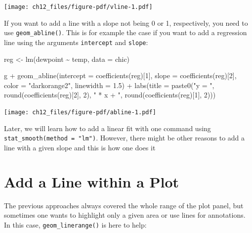 \documentclass[
  letterpaper,
]{scrbook}
\newenvironment{Shaded}{\begin{snugshade}}{\end{snugshade}}
\newcommand{\AttributeTok}[1]{\textcolor[rgb]{0.40,0.45,0.13}{#1}}
\newcommand{\DecValTok}[1]{\textcolor[rgb]{0.68,0.00,0.00}{#1}}
\newcommand{\FloatTok}[1]{\textcolor[rgb]{0.68,0.00,0.00}{#1}}
\newcommand{\FunctionTok}[1]{\textcolor[rgb]{0.28,0.35,0.67}{#1}}
\newcommand{\NormalTok}[1]{\textcolor[rgb]{0.00,0.23,0.31}{#1}}
\newcommand{\OtherTok}[1]{\textcolor[rgb]{0.00,0.23,0.31}{#1}}
\newcommand{\SpecialCharTok}[1]{\textcolor[rgb]{0.37,0.37,0.37}{#1}}
\newcommand{\StringTok}[1]{\textcolor[rgb]{0.13,0.47,0.30}{#1}}
\begin{document}
\texttt{[image: ch12\_files/figure-pdf/vline-1.pdf]}

If you want to add a line with a slope not being 0 or 1, respectively,
you need to use \texttt{geom\_abline()}. This is for example the case if
you want to add a regression line using the arguments \texttt{intercept}
and \texttt{slope}:

\begin{Shaded}
\begin{Highlighting}[]
\NormalTok{reg }\OtherTok{\textless{}{-}} \FunctionTok{lm}\NormalTok{(dewpoint }\SpecialCharTok{\textasciitilde{}}\NormalTok{ temp, }\AttributeTok{data =}\NormalTok{ chic)}

\NormalTok{g }\SpecialCharTok{+}
  \FunctionTok{geom\_abline}\NormalTok{(}\AttributeTok{intercept =} \FunctionTok{coefficients}\NormalTok{(reg)[}\DecValTok{1}\NormalTok{],}
              \AttributeTok{slope =} \FunctionTok{coefficients}\NormalTok{(reg)[}\DecValTok{2}\NormalTok{],}
              \AttributeTok{color =} \StringTok{"darkorange2"}\NormalTok{, }
              \AttributeTok{linewidth =} \FloatTok{1.5}\NormalTok{) }\SpecialCharTok{+}
  \FunctionTok{labs}\NormalTok{(}\AttributeTok{title =} \FunctionTok{paste0}\NormalTok{(}\StringTok{"y = "}\NormalTok{, }\FunctionTok{round}\NormalTok{(}\FunctionTok{coefficients}\NormalTok{(reg)[}\DecValTok{2}\NormalTok{], }\DecValTok{2}\NormalTok{),}
                      \StringTok{" * x + "}\NormalTok{, }\FunctionTok{round}\NormalTok{(}\FunctionTok{coefficients}\NormalTok{(reg)[}\DecValTok{1}\NormalTok{], }\DecValTok{2}\NormalTok{)))}
\end{Highlighting}
\end{Shaded}

\texttt{[image: ch12\_files/figure-pdf/abline-1.pdf]}

Later, we will learn how to add a linear fit with one command using
\texttt{stat\_smooth(method\ =\ "lm")}. However, there might be other
reasons to add a line with a given slope and this is how one does it 🤷

\section{Add a Line within a Plot}\label{add-a-line-within-a-plot}

The previous approaches always covered the whole range of the plot
panel, but sometimes one wants to highlight only a given area or use
lines for annotations. In this case, \texttt{geom\_linerange()} is here
to help:
\end{document}
